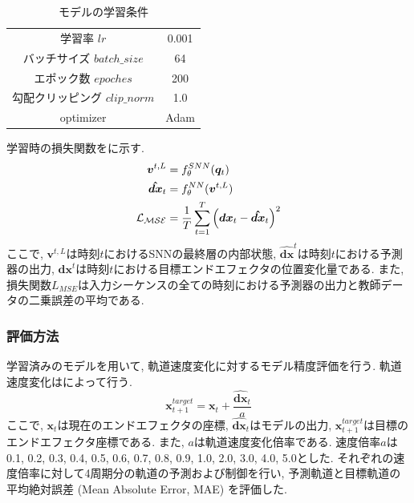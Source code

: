 \begin{table}[htb]
    \centering
    \caption{モデルの学習条件}
    \label{tab:exp3:train:parameter}
    \begin{tabular}{cc}
        \hline
        学習率 $lr$ & 0.001\\
        バッチサイズ $batch\_size$ & 64\\
        エポック数 $epoches$ & 200\\
        勾配クリッピング $clip\_norm$ & 1.0\\
        optimizer & Adam\\
        \hline
    \end{tabular}
\end{table}

学習時の損失関数をに示す.
\begin{align}
    \bm{v}^{t,L} &= f_{\theta}^{SNN}(\bm{q}_{t}) \notag \\
    \bm{\hat{dx}}_{t} &= f_{\theta}^{NN}(\bm{v}^{t,L}) \notag \\
    \mathcal{L_{MSE}} &= \frac{1}{T} \sum_{t=1}^{T} \left( \bm{dx}_{t} - \bm{\hat{dx}}_{t} \right)^2 \label{eq:exp3:loss}
\end{align}
ここで, $\bm{v}^{t,L}$は時刻$t$におけるSNNの最終層の内部状態, $\bm{\hat{dx}}^{t}$は時刻$t$における予測器の出力, $\bm{dx}^{t}$は時刻$t$における目標エンドエフェクタの位置変化量である.
また, 損失関数$L_{MSE}$は入力シーケンスの全ての時刻における予測器の出力と教師データの二乗誤差の平均である.


\subsubsection{評価方法}
学習済みのモデルを用いて, 軌道速度変化に対するモデル精度評価を行う.
軌道速度変化はによって行う.
\begin{equation}
    \bm{x}_{t+1}^{target} = \bm{x}_{t} + \frac{\bm{\hat{dx}}_{t}} {a} \label{eq:exp3:target_trajectoryx}
\end{equation}
ここで, $\bm{x}_{t}$は現在のエンドエフェクタの座標, $\bm{\hat{dx}}_{t}$はモデルの出力, $\bm{x}_{t+1}^{target}$は目標のエンドエフェクタ座標である.
また, $a$は軌道速度変化倍率である.
速度倍率$a$は0.1, 0.2, 0.3, 0.4, 0.5, 0.6, 0.7, 0.8, 0.9, 1.0, 2.0, 3.0, 4.0, 5.0とした.
それぞれの速度倍率に対して4周期分の軌道の予測および制御を行い, 予測軌道と目標軌道の平均絶対誤差 (Mean Absolute Error, MAE) を評価した.

